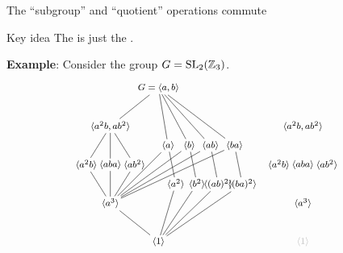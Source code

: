 \documentclass[8pt, handout]{beamer}
\newcommand{\Pause}{}      %
\begin{document}
\begin{frame}{The ``subgroup'' and ``quotient'' operations commute} 
  
  \begin{alertblock}{Key idea}
    The  is just the .
  \end{alertblock}

  \medskip\Pause
  
  \textbf{Example}: Consider the group $G=\operatorname{SL}_2(\mathbb{Z}_3)$.
  \[
  \hspace*{-2mm}
  \begin{tikzpicture}[node distance=1cm,shorten >= -2pt, shorten <= -2pt,scale=.6]
    \begin{scope}[shift={(0,0)}]
      \tikzstyle{every node}=[font=\footnotesize]
      \node (1) {$\<1\>$};
      \node (a3) at (-2.5,2) {$\<a^3\>$};
      \node (a2) at (.9,3) {$\<a^2\>$};
      \node (b2) at (2,3) {$\<b^2\>$};
      \node (abab) at (3.1,3) {$\<(ab)^2\>$};
      \node (baba) at (4.35,3) {$\<(ba)^2\>$};
      \node (a2b) at (-3.75,4) {$\<a^2b\>$};
      \node (aba) at (-2.5,4) {$\<aba\>$};
      \node (ab2) at (-1.25,4) {$\<ab^2\>$};
      \node (a) at (.5,5) {$\<a\>$};
      \node (b) at (1.6,5) {$\<b\>$};
      \node (ab) at (2.7,5) {$\<ab\>$};
      \node (ba) at (3.95,5) {$\<ba\>$};
      \node (a2b-ab2) at (-2.5,6) {$\<a^2b,ab^2\>$};
      \node (G) at (0,8) {$G=\<a,b\>$};
      \draw (1) -- (a3);
      \draw (1) -- (a2);
      \draw (1) -- (b2);
      \draw (1) -- (abab);
      \draw (1) -- (baba);
      \draw (a3) -- (a2b);
      \draw (a3) -- (aba);
      \draw (a3) -- (ab2);
      \draw (a3) -- (a);
      \draw (a3) -- (b);
      \draw (a3) -- (ab);
      \draw (a3) -- (ba);
      \draw (a2) -- (a);
      \draw (b2) -- (b);
      \draw (abab) -- (ab);
      \draw (baba) -- (ba);
      \draw (a2b) -- (a2b-ab2);
      \draw (aba) -- (a2b-ab2);
      \draw (ab2) -- (a2b-ab2);
      \draw (G) -- (a2b-ab2);
      \draw (G) -- (a);
      \draw (G) -- (b);
      \draw (G) -- (ab);
      \draw (G) -- (ba);
    \end{scope}
    \begin{scope}[shift={(10,0)}]
      \tikzstyle{every node}=[font=\footnotesize]
      \node (1) at (-2.5,0) {\color{faded}$\<1\>$};
      \node (a3) at (-2.5,2) {$\<a^3\>$};
      \node (a2b) at (-3.75,4) {$\<a^2b\>$};
      \node (aba) at (-2.5,4) {$\<aba\>$};
      \node (ab2) at (-1.25,4) {$\<ab^2\>$};
      \node (a2b-ab2) at (-2.5,6) {$\<a^2b,ab^2\>$};

\end{scope}
\end{tikzpicture}\]
\end{frame}
\end{document}
